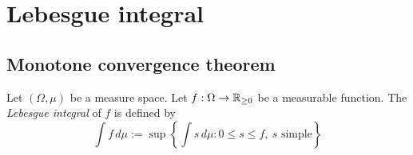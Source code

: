 \documentclass{../../large}
\begin{document}
\chapter{Lebesgue integral}
\section{Monotone convergence theorem}


\begin{prb}
Let $(\Omega,\mu)$ be a measure space.
Let $f:\Omega\to\mathbb{R}_{\ge0}$ be a measurable function.
The \emph{Lebesgue integral} of $f$ is defined by
\[\int f\,d\mu:=\sup\left\{\int s\,d\mu:0\le s\le f,\ \text{$s$ simple}\right\}\]
\end{prb}
\end{document}

